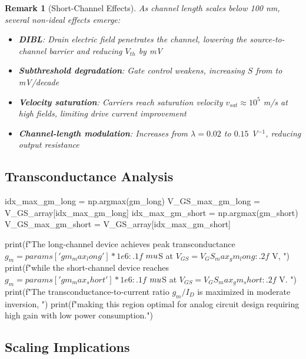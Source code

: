 \documentclass[a4paper, 11pt]{article}
\newtheorem{remark}{Remark}[section]
\begin{document}
\begin{remark}[Short-Channel Effects]
As channel length scales below 100 nm, several non-ideal effects emerge:
\begin{itemize}
\item \textbf{DIBL}: Drain electric field penetrates the channel, lowering the source-to-channel barrier and reducing $V_{th}$ by  mV
\item \textbf{Subthreshold degradation}: Gate control weakens, increasing $S$ from  to  mV/decade
\item \textbf{Velocity saturation}: Carriers reach saturation velocity $v_{sat} \approx 10^5$ m/s at high fields, limiting drive current improvement
\item \textbf{Channel-length modulation}: Increases from $\lambda = 0.02$ to $0.15$ V$^{-1}$, reducing output resistance
\end{itemize}
\end{remark}

\subsection{Transconductance Analysis}

\begin{pycode}
idx_max_gm_long = np.argmax(gm_long)
V_GS_max_gm_long = V_GS_array[idx_max_gm_long]
idx_max_gm_short = np.argmax(gm_short)
V_GS_max_gm_short = V_GS_array[idx_max_gm_short]

print(f"The long-channel device achieves peak transconductance $g_m = {params['gm_max_long']*1e6:.1f}$ $\\mu$S at $V_{{GS}} = {V_GS_max_gm_long:.2f}$ V, ")
print(f"while the short-channel device reaches $g_m = {params['gm_max_short']*1e6:.1f}$ $\\mu$S at $V_{{GS}} = {V_GS_max_gm_short:.2f}$ V. ")
print(f"The transconductance-to-current ratio $g_m/I_D$ is maximized in moderate inversion, ")
print(f"making this region optimal for analog circuit design requiring high gain with low power consumption.")
\end{pycode}

\subsection{Scaling Implications}
\end{document}
